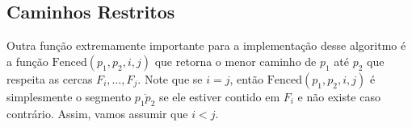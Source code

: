 \documentclass{article}
\begin{document}
\subsection{Caminhos Restritos}

Outra função extremamente importante para a implementação desse algoritmo é a função \(\text{Fenced}(p_1, p_2, i, j)\) que retorna o menor caminho de \(p_1\) até \(p_2\) que respeita as cercas \(F_i, \dots, F_j\). Note que se \(i = j\), então \(\text{Fenced}(p_1, p_2, i, j)\) é simplesmente o segmento \(\overline{p_1p_2}\) se ele estiver contido em \(F_i\) e não existe caso contrário. Assim, vamos assumir que \(i < j\).


\end{document}
